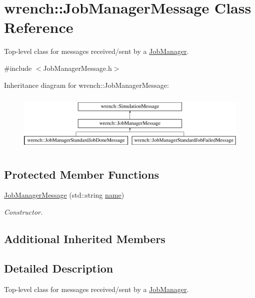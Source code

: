 \hypertarget{classwrench_1_1_job_manager_message}{}\section{wrench\+:\+:Job\+Manager\+Message Class Reference}
\label{classwrench_1_1_job_manager_message}


Top-\/level class for messages received/sent by a \hyperlink{classwrench_1_1_job_manager}{Job\+Manager}.  




{\ttfamily \#include $<$Job\+Manager\+Message.\+h$>$}

Inheritance diagram for wrench\+:\+:Job\+Manager\+Message\+:\begin{figure}[H]
\begin{center}
\leavevmode
\includegraphics[height=2.818792cm]{classwrench_1_1_job_manager_message}
\end{center}
\end{figure}
\subsection*{Protected Member Functions}
\begin{DoxyCompactItemize}
\item 
\hyperlink{classwrench_1_1_job_manager_message_a9f5d8c99d8e2951ab0d9bdb7d82a9b04}{Job\+Manager\+Message} (std\+::string \hyperlink{classwrench_1_1_simulation_message_ab224f6dd8ec5ee2e7f65bfcdf2b8a86b}{name})
\begin{DoxyCompactList}\small\item\em Constructor. \end{DoxyCompactList}\end{DoxyCompactItemize}
\subsection*{Additional Inherited Members}


\subsection{Detailed Description}
Top-\/level class for messages received/sent by a \hyperlink{classwrench_1_1_job_manager}{Job\+Manager}. 

